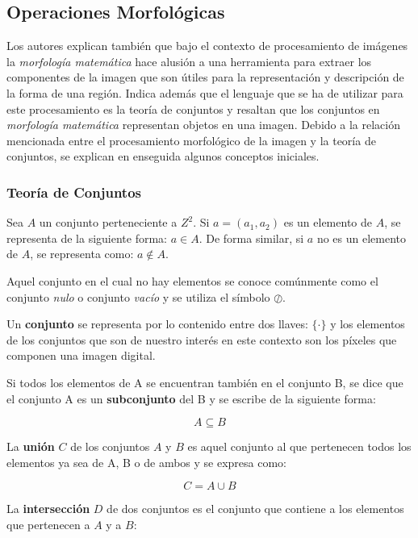 \subsection{Operaciones Morfológicas}

Los autores explican también que bajo el contexto de procesamiento de imágenes la \textit{morfología matemática} hace alusión a una herramienta para extraer los componentes de la imagen que son útiles para la representación y descripción de la forma de una región. Indica además que el lenguaje que se ha de utilizar para este procesamiento es la teoría de conjuntos y resaltan que los conjuntos en \textit{morfología matemática} representan objetos en una imagen.
Debido a la relación mencionada entre el procesamiento morfológico de la imagen y la teoría de conjuntos, se explican en enseguida algunos conceptos iniciales.

\subsubsection{Teoría de Conjuntos}
Sea $A$ un conjunto perteneciente a $Z^2$. Si $a = (a_{1}, a_{2})$ es un elemento de $A$, se representa de la siguiente forma: $a \in A$. De forma similar, si $a$ no es un elemento de $A$, se representa como: $a\notin A$.

Aquel conjunto en el cual no hay elementos se conoce comúnmente como el conjunto \textit{nulo} o conjunto \textit{vacío} y se utiliza el símbolo $\oslash$.

Un \textbf{conjunto} se representa por lo contenido entre dos llaves: $\{\cdot\}$ y los elementos de los conjuntos que son de nuestro interés en este contexto son los píxeles que componen una imagen digital.

Si todos los elementos de A se encuentran también en el conjunto B, se dice que el conjunto A es un \textbf{subconjunto} del B y se escribe de la siguiente forma:

\begin{equation}
A\subseteq B
\label{eqn:subconjunto}
\end{equation}

La \textbf{unión} $C$ de los conjuntos $A$ y $B$ es aquel conjunto al que pertenecen todos los elementos ya sea de A, B o de ambos y se expresa como:

\begin{equation}
C = A \cup B
\label{eqn:union}
\end{equation}

La \textbf{intersección} $D$ de dos conjuntos es el conjunto que contiene a los elementos que pertenecen a $A$ y a $B$:

